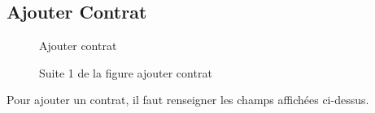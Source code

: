\documentclass[a4paper]{report}
\begin{document}
\begin{doublespace}
\subsection{Ajouter Contrat}
\begin{figure}[H]
	\begin{center}
		\caption{Ajouter contrat}
	\end{center}
\end{figure}
\begin{figure}[H]
	\begin{center}
		\caption{Suite 1 de la figure ajouter contrat}
	\end{center}
\end{figure}
Pour ajouter un contrat, il faut renseigner les champs affichées ci-dessus.
\begin{figure}[H]
	\begin{center}

\end{center}
\end{figure}
\end{doublespace}
\end{document}
